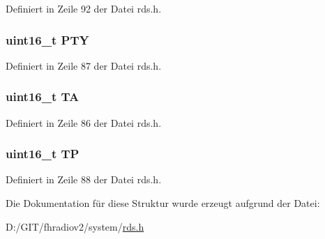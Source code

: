 Definiert in Zeile 92 der Datei rds.\+h.

\hypertarget{structgroup__0b_a0474967478fbbc2c71b800d2e0132d45}{}
\subsubsection[{P\+T\+Y}]{\setlength{\rightskip}{0pt plus 5cm}uint16\+\_\+t P\+T\+Y}\label{structgroup__0b_a0474967478fbbc2c71b800d2e0132d45}


Definiert in Zeile 87 der Datei rds.\+h.

\hypertarget{structgroup__0b_a6de7751205cef4ffcce610399a030892}{}
\subsubsection[{T\+A}]{\setlength{\rightskip}{0pt plus 5cm}uint16\+\_\+t T\+A}\label{structgroup__0b_a6de7751205cef4ffcce610399a030892}


Definiert in Zeile 86 der Datei rds.\+h.

\hypertarget{structgroup__0b_ab9e634c63b0d95a96716d5f6d7f06d72}{}
\subsubsection[{T\+P}]{\setlength{\rightskip}{0pt plus 5cm}uint16\+\_\+t T\+P}\label{structgroup__0b_ab9e634c63b0d95a96716d5f6d7f06d72}


Definiert in Zeile 88 der Datei rds.\+h.



Die Dokumentation für diese Struktur wurde erzeugt aufgrund der Datei\+:\begin{DoxyCompactItemize}
\item 
D\+:/\+G\+I\+T/fhradiov2/system/\hyperlink{rds_8h}{rds.\+h}\end{DoxyCompactItemize}
